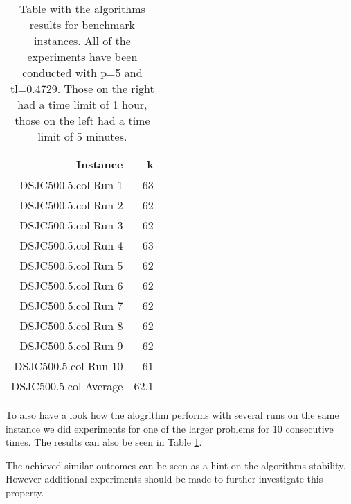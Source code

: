 \documentclass[a4paper]{scrartcl}
\begin{document}
\begin{table}
\begin{adjustwidth}{-.5in}{-.5in}
\begin{center}
\begin{tabular}{r | r  }
            \hline
Instance & k  \\
\hline \hline 

DSJC500.5.col Run 1 & 63 \\
DSJC500.5.col Run 2 & 62 \\
DSJC500.5.col Run 3 & 62 \\
DSJC500.5.col Run 4 & 63 \\
DSJC500.5.col Run 5 & 62 \\
DSJC500.5.col Run 6 & 62 \\
DSJC500.5.col Run 7 & 62 \\
DSJC500.5.col Run 8 & 62 \\
DSJC500.5.col Run 9 & 62 \\
DSJC500.5.col Run 10 & 61 \\
DSJC500.5.col Average & 62.1 \\ 



\hline
\end{tabular}
          
        \caption{Table with the algorithms results for benchmark instances. All of the experiments have been conducted with p=5 and tl=0.4729. Those on the right had a time limit of 1 hour, those on the left had a time limit of 5 minutes. }
        \label{myTable1}
        \end{center}
    \end{adjustwidth}
\end{table}

To also have a look how the alogrithm performs with several runs on the same instance we did experiments for one of the larger problems for 10 consecutive times.
The results can also be seen in Table \ref{myTable1}.



The achieved similar outcomes can be seen as a hint on the algorithms stability. However additional experiments should be made to further investigate this property.





\end{document}
